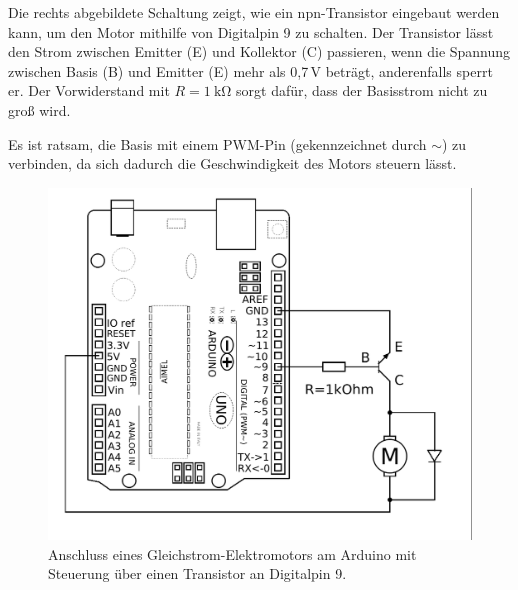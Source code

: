 \medskip
\begin{minipage}{0.5\textwidth}
	Die rechts abgebildete Schaltung zeigt, wie ein npn-Transistor eingebaut werden kann, um den Motor mithilfe von Digitalpin 9 zu schalten. Der Transistor lässt den Strom zwischen Emitter (E) und Kollektor (C) passieren, wenn die Spannung zwischen Basis (B) und Emitter (E) mehr als 0,7\,V beträgt, anderenfalls sperrt er. Der Vorwiderstand mit $R=\SI{1}{\kilo\ohm}$ sorgt dafür, dass der Basisstrom nicht zu groß wird.
	
	Es ist ratsam, die Basis mit einem PWM-Pin (gekennzeichnet durch $\sim$) zu verbinden, da sich dadurch die Geschwindigkeit des Motors steuern lässt.
\end{minipage}
\hfill
\begin{minipage}{0.48\textwidth}
	\begin{figure}[H]
		\centering
		\includegraphics[width=\textwidth]{./Zeichnungen/Schaltplan-Motoranschluss-mit-Steuerung.png}
		\caption{Anschluss eines Gleichstrom-Elektromotors am Arduino mit Steuerung über einen Transistor an Digitalpin 9.}
	\end{figure}
\end{minipage}

